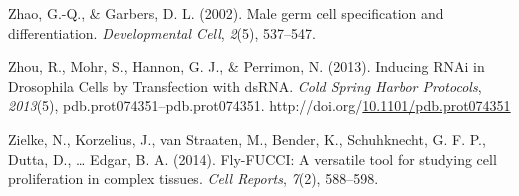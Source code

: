 \documentclass[12pt,oneside]{reedthesis}
\newlength{\cslhangindent}
\newenvironment{CSLReferences}[2] %
 {%
  \setlength{\parindent}{0pt}
  \ifodd #1 \everypar{\setlength{\hangindent}{\cslhangindent}}\ignorespaces\fi
  \ifnum #2 > 0
  \setlength{\parskip}{#2\baselineskip}
  \fi
 }%
 {}
\begin{document}
\begin{CSLReferences}{1}{0}
\leavevmode{}%
Zhao, G.-Q., \& Garbers, D. L. (2002). Male germ cell specification and differentiation. \emph{Developmental Cell}, \emph{2}(5), 537--547.

\leavevmode{}%
Zhou, R., Mohr, S., Hannon, G. J., \& Perrimon, N. (2013). Inducing {RNAi} in {Drosophila Cells} by {Transfection} with {dsRNA}. \emph{Cold Spring Harbor Protocols}, \emph{2013}(5), pdb.prot074351--pdb.prot074351. http://doi.org/\href{https://doi.org/10.1101/pdb.prot074351}{10.1101/pdb.prot074351}

\leavevmode{}%
Zielke, N., Korzelius, J., van Straaten, M., Bender, K., Schuhknecht, G. F. P., Dutta, D., \ldots{} Edgar, B. A. (2014). Fly-{FUCCI}: {A} versatile tool for studying cell proliferation in complex tissues. \emph{Cell Reports}, \emph{7}(2), 588--598.

\end{CSLReferences}

\end{document}
